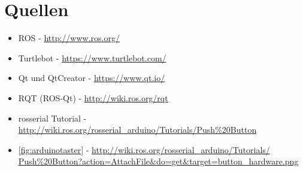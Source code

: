 \documentclass[a4paper,12pt,headsepline]{scrartcl}
\begin{document}
		
	\newpage
\section{Quellen}
\begin{itemize}
\item ROS - \href{http://www.ros.org/}{http://www.ros.org/}
\item Turtlebot - \href{https://www.turtlebot.com/}{https://www.turtlebot.com/}
\item Qt und QtCreator - \href{https://www.qt.io/}{https://www.qt.io/}
\item RQT (ROS-Qt) - \href{http://wiki.ros.org/rqt}{http://wiki.ros.org/rqt}
\item rosserial Tutorial - \href{http://wiki.ros.org/rosserial\_arduino/Tutorials/Push\%20Button}{http://wiki.ros.org/rosserial\_arduino/Tutorials/Push\%20Button}
\item \cref{fig:arduinotaster} - \href{http://wiki.ros.org/rosserial_arduino/Tutorials/Push\%20Button?action=AttachFile&do=get&target=button_hardware.png}{http://wiki.ros.org/rosserial\_arduino/Tutorials/\\Push\%20Button?action=AttachFile\&do=get\&target=button\_hardware.png}
\end{itemize}
\end{document}
